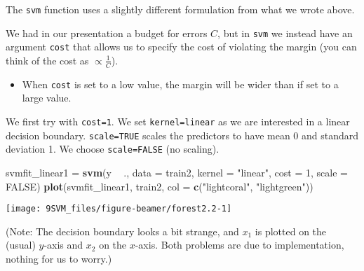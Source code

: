 \documentclass[10pt,ignorenonframetext,]{beamer}
\newenvironment{Shaded}{\begin{snugshade}}{\end{snugshade}}
\newcommand{\DataTypeTok}[1]{\textcolor[rgb]{0.13,0.29,0.53}{#1}}
\newcommand{\DecValTok}[1]{\textcolor[rgb]{0.00,0.00,0.81}{#1}}
\newcommand{\KeywordTok}[1]{\textcolor[rgb]{0.13,0.29,0.53}{\textbf{#1}}}
\newcommand{\NormalTok}[1]{#1}
\newcommand{\OperatorTok}[1]{\textcolor[rgb]{0.81,0.36,0.00}{\textbf{#1}}}
\newcommand{\OtherTok}[1]{\textcolor[rgb]{0.56,0.35,0.01}{#1}}
\newcommand{\StringTok}[1]{\textcolor[rgb]{0.31,0.60,0.02}{#1}}
\providecommand{\tightlist}{%
  \setlength{\itemsep}{0pt}\setlength{\parskip}{0pt}}
\begin{document}
\begin{frame}[fragile]

The \texttt{svm} function uses a slightly different formulation from
what we wrote above.

We had in our presentation a budget for errors \(C\), but in
\texttt{svm} we instead have an argument \texttt{cost} that allows us to
specify the cost of violating the margin (you can think of the cost as
\(\propto \frac{1}{C}\)).

\begin{itemize}
\tightlist
\item
  When \texttt{cost} is set to a low value, the margin will be wider
  than if set to a large value.
\end{itemize}

We first try with \texttt{cost=1}. We set
\texttt{kernel=\textquotesingle{}linear\textquotesingle{}} as we are
interested in a linear decision boundary. \texttt{scale=TRUE} scales the
predictors to have mean 0 and standard deviation 1. We choose
\texttt{scale=FALSE} (no scaling).

\end{frame}

\begin{frame}[fragile]

\footnotesize

\begin{Shaded}
\begin{Highlighting}[]
\NormalTok{svmfit_linear1 =}\StringTok{ }\KeywordTok{svm}\NormalTok{(y }\OperatorTok{~}\StringTok{ }\NormalTok{., }\DataTypeTok{data =}\NormalTok{ train2, }\DataTypeTok{kernel =} \StringTok{"linear"}\NormalTok{, }\DataTypeTok{cost =} \DecValTok{1}\NormalTok{, }
    \DataTypeTok{scale =} \OtherTok{FALSE}\NormalTok{)}
\KeywordTok{plot}\NormalTok{(svmfit_linear1, train2, }\DataTypeTok{col =} \KeywordTok{c}\NormalTok{(}\StringTok{"lightcoral"}\NormalTok{, }\StringTok{"lightgreen"}\NormalTok{))}
\end{Highlighting}
\end{Shaded}

\begin{center}\texttt{[image: 9SVM\_files/figure-beamer/forest2.2-1]} \end{center}

(Note: The decision boundary looks a bit strange, and \(x_1\) is plotted
on the (usual) \(y\)-axis and \(x_2\) on the \(x\)-axis. Both problems
are due to implementation, nothing for us to worry.)

\end{frame}
\end{document}
